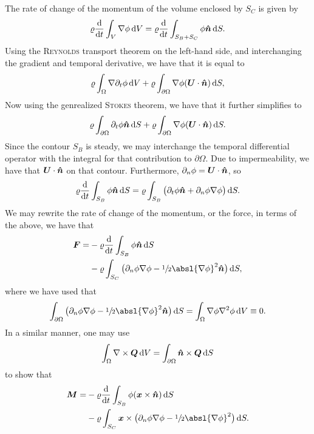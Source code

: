 The rate of change of the momentum of the volume enclosed by $S_C$ is given by
\[
    \varrho \frac{\mathrm{d}}{\mathrm{d} t}\int_{V} \nabla\phi \,\mathrm{d} V = \varrho \frac{\mathrm{d}}{\mathrm{d} t}\int_{S_B + S_C} \phi \bm{\hat{n}} \,\mathrm{d} S.
\]
Using the \textsc{Reynolds} transport theorem on the left-hand side, and interchanging the gradient and temporal derivative, we have that it is equal to
\[
    \varrho \int_{\Omega} \nabla\partial_t\phi \,\mathrm{d} V + \varrho \int_{\partial\Omega} \nabla\phi (\bm{U} \cdot \bm{\hat{n}}) \,\mathrm{d} S,
\]
Now using the genrealized \textsc{Stokes} theorem, we have that it further simplifies to
\[
    \varrho \int_{\partial\Omega} \partial_t \phi \bm{\hat{n}} \,\mathrm{d} S + \varrho \int_{\partial\Omega} \nabla\phi (\bm{U} \cdot \bm{\hat{n}}) \,\mathrm{d} S.
\]
Since the contour $S_B$ is steady, we may interchange the temporal differential operator with the integral for that contribution to $\partial\Omega$.
Due to impermeability, we have that $\bm{U} \cdot \bm{\hat{n}}$ on that contour.
Furthermore, $\partial_n \phi = \bm{U} \cdot \bm{\hat{n}}$, so
\[
    \varrho \frac{\mathrm{d}}{\mathrm{d} t} \int_{S_B} \phi \bm{\hat{n}} \,\mathrm{d} S = \varrho \int_{S_B} \big( \partial_t\phi\bm{\hat{n}} + \partial_n \phi \nabla\phi \big) \,\mathrm{d} S.
\]
We may rewrite the rate of change of the momentum, or the force, in terms of the above, we have that
\begin{equation*}
    \begin{aligned}
        \bm{F} = & - \varrho \frac{\dee}{\dee t} \int_{S_B} \phi \nhat \,\dee S\\
        & - \varrho\int_{S_C} \big( \partial_n \phi \nabla\phi - \sfrac{1}{2}\absl{\nabla \phi}^2 \nhat \big) \,\dee S,
    \end{aligned}
\end{equation*}
where we have used that
\[
    \int_{\partial\Omega} \big( \partial_n\phi \nabla\phi - \sfrac{1}{2}\absl{\nabla \phi}^2 \nhat \big) \,\dee S = \int_{\Omega} \nabla\phi \nabla^2 \phi \,\dee V \equiv 0.
\]
In a similar manner, one may use
\[
    \int_{\Omega} \nabla\times\bm{Q} \,\mathrm{d} V = \int_{\partial\Omega} \bm{\hat{n}}\times\bm{Q} \,\mathrm{d} S
\]
to show that
\begin{equation*}
    \begin{aligned}
        \bm{M} = & - \varrho \frac{\dee}{\dee t}\int_{S_B} \phi (\xvec\times\nhat) \,\dee S\\
        & - \varrho \int_{S_C} \xvec\times \big( \partial_n \phi \nabla\phi - \sfrac{1}{2}{\absl{\nabla\phi}}^2 \big) \,\dee S.
    \end{aligned}
\end{equation*}